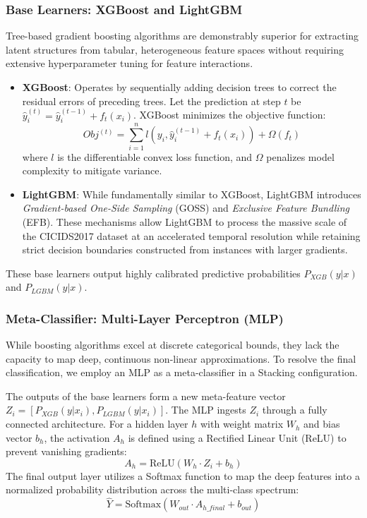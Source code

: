 \subsubsection{Base Learners: XGBoost and LightGBM}
Tree-based gradient boosting algorithms are demonstrably superior for extracting latent structures from tabular, heterogeneous feature spaces without requiring extensive hyperparameter tuning for feature interactions.
\begin{itemize}
    \item \textbf{XGBoost}: Operates by sequentially adding decision trees to correct the residual errors of preceding trees. Let the prediction at step $t$ be $\hat{y}_i^{(t)} = \hat{y}_i^{(t-1)} + f_t(x_i)$. XGBoost minimizes the objective function:
    \begin{equation}
        Obj^{(t)} = \sum_{i=1}^{n} l\left(y_i, \hat{y}_i^{(t-1)} + f_t(x_i)\right) + \Omega(f_t)
    \end{equation}
    where $l$ is the differentiable convex loss function, and $\Omega$ penalizes model complexity to mitigate variance.
    \item \textbf{LightGBM}: While fundamentally similar to XGBoost, LightGBM introduces \textit{Gradient-based One-Side Sampling} (GOSS) and \textit{Exclusive Feature Bundling} (EFB). These mechanisms allow LightGBM to process the massive scale of the CICIDS2017 dataset at an accelerated temporal resolution while retaining strict decision boundaries constructed from instances with larger gradients.
\end{itemize}
These base learners output highly calibrated predictive probabilities $P_{XGB}(y|x)$ and $P_{LGBM}(y|x)$.

\subsubsection{Meta-Classifier: Multi-Layer Perceptron (MLP)}
While boosting algorithms excel at discrete categorical bounds, they lack the capacity to map deep, continuous non-linear approximations. To resolve the final classification, we employ an MLP as a meta-classifier in a Stacking configuration.

The outputs of the base learners form a new meta-feature vector $Z_i = [P_{XGB}(y|x_i), P_{LGBM}(y|x_i)]$. The MLP ingests $Z_i$ through a fully connected architecture. For a hidden layer $h$ with weight matrix $W_h$ and bias vector $b_h$, the activation $A_h$ is defined using a Rectified Linear Unit (ReLU) to prevent vanishing gradients:
\begin{equation}
    A_h = \text{ReLU}(W_h \cdot Z_i + b_h)
\end{equation}
The final output layer utilizes a Softmax function to map the deep features into a normalized probability distribution across the multi-class spectrum:
\begin{equation}
    \hat{Y} = \text{Softmax}(W_{out} \cdot A_{h\_final} + b_{out})
\end{equation}

